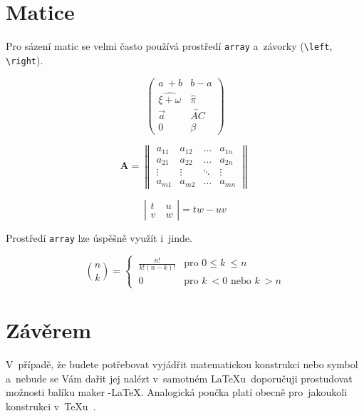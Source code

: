 \documentclass[11pt, a4paper, twocolumn]{article}
\theoremstyle{definition}
\theoremstyle{plain}
\begin{document}
\section{Matice}
Pro sázení matic se velmi často používá prostředí \texttt{array} a~závorky (\verb|\left|, \verb|\right|).

$$\left(\begin{array}{ccc}
a~+ b & b - a\\
\widehat{\xi + \omega} & \hat{\pi}\\
\vec{a} & \overleftrightarrow{AC}\\
0 & \beta
\end{array}\right)$$

$$\mathbf{A} = \left\|\begin{array}{cccc}
a_{11} & a_{12} & \ldots & a_{1n}\\
a_{21} & a_{22} & \ldots & a_{2n}\\
\vdots & \vdots &\ddots  & \vdots\\
a_{m1} & a_{m2} & \dots & a_{mn}
\end{array}\right\|$$

$$ \left|\begin{array}{lcr}
t & u\\
v~& w
\end{array}\right| = tw - uv$$

Prostředí \texttt{array} lze úspěšně využít i~jinde.

$$
\binom{n}{k} = \begin{cases}
\ \frac{n!}{k!(n - k)!} & \text{pro } 0 \leq k~\leq n\\
\ 0 & \text{pro } k~< 0 \text{ nebo } k~> n
\end{cases}
$$

\section{Závěrem}
V~případě, že budete potřebovat vyjádřit matematickou konstrukci nebo symbol a~nebude se Vám dařit jej nalézt v~samotném \LaTeX u\, doporučuji prostudovat možnosti balíku maker \AmS-\LaTeX.
Analogická poučka platí obecně pro~jakoukoli konstrukci v~\TeX u\ .
\end{document}
